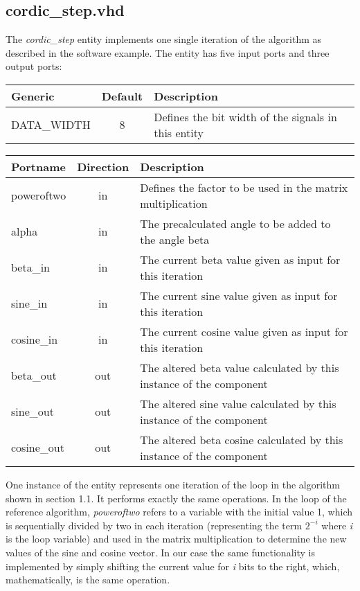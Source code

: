 \subsection{cordic\_step.vhd}

The \textit{cordic\_step} entity implements one single iteration of the algorithm as described in the software example. The entity has five input ports and three output ports:

\begin{center}
	\begin{tabular}{ | l | c | l | }
		\hline
		\textbf{Generic} & \textbf{Default} & \textbf{Description} \\
		\hline
		DATA\_WIDTH & 8 & Defines the bit width of the signals in this entity \\
		\hline
	\end{tabular} 
\end{center}

\begin{center}
	\begin{tabular}{ | l | c | l | }
		\hline
		\textbf{Portname} & \textbf{Direction} & \textbf{Description} \\
		\hline
		poweroftwo & in & Defines the factor to be used in the matrix multiplication \\
		alpha & in  & The precalculated angle to be added to the angle beta \\
		beta\_in & in  & The current beta value given as input for this iteration \\
		sine\_in & in  & The current sine value given as input for this iteration \\
		cosine\_in & in  & The current cosine value given as input for this iteration \\
		beta\_out & out  & The altered beta value calculated by this instance of the component \\
		sine\_out & out  & The altered sine value calculated by this instance of the component \\
		cosine\_out & out  & The altered beta cosine calculated by this instance of the component \\
		\hline
	\end{tabular} 
\end{center}

One instance of the entity represents one iteration of the loop in the algorithm shown in section 1.1. It performs exactly the same operations. In the loop of the reference algorithm, \textit{poweroftwo} refers to a variable with the initial value 1, which is sequentially divided by two in each iteration (representing the term \(2^{-i}\) where \textit{i} is the loop variable) and used in the matrix multiplication to determine the new values of the sine and cosine vector. In our case the same functionality is implemented by simply shifting the current value for \textit{i} bits to the right, which, mathematically, is the same operation.

